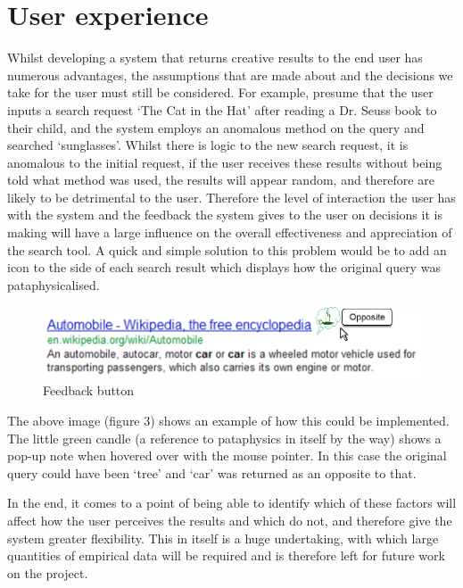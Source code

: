 \section{User experience}
Whilst developing a system that returns creative results to the end user has numerous advantages, the assumptions that are made about and the decisions we take for the user must still be considered. For example, presume that the user inputs a search request `The Cat in the Hat' after reading a Dr. Seuss book to their child, and the system employs an anomalous method on the query and searched `sunglasses'. Whilst there is logic to the new search request, it is anomalous to the initial request, if the user receives these results without being told what method was used, the results will appear random, and therefore are likely to be detrimental to the user. Therefore the level of interaction the user has with the system and the feedback the system gives to the user on decisions it is making will have a large influence on the overall effectiveness and appreciation of the search tool. A quick and simple solution to this problem would be to add an icon to the side of each search result which displays how the original query was pataphysicalised.

\begin{figure}[htb] %
  \centering
  \includegraphics[width=\linewidth]{images/resultexample}
\caption[Feedback button]{Feedback button}
\label{fig:feedback}
\end{figure}

The above image (figure 3) shows an example of how this could be implemented. The little green candle (a reference to pataphysics in itself by the way) shows a pop-up note when hovered over with the mouse pointer. In this case the original query could have been ‘tree’ and ‘car’ was returned as an opposite to that.

In the end, it comes to a point of being able to identify which of these factors will affect how the user perceives the results and which do not, and therefore give the system greater flexibility. This in itself is a huge undertaking, with which large quantities of empirical data will be required and is therefore left for future work on the project.

